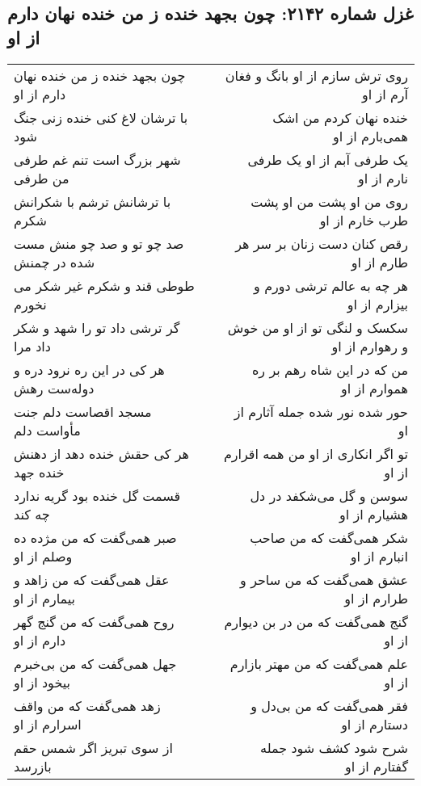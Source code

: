 \begin{center}
\section*{غزل شماره ۲۱۴۲: چون بجهد خنده ز من خنده نهان دارم از او}
\label{sec:2142}
\begin{longtable}{l p{0.5cm} r}
چون بجهد خنده ز من خنده نهان دارم از او
&&
روی ترش سازم از او بانگ و فغان آرم از او
\\
با ترشان لاغ کنی خنده زنی جنگ شود
&&
خنده نهان کردم من اشک همی‌بارم از او
\\
شهر بزرگ است تنم غم طرفی من طرفی
&&
یک طرفی آبم از او یک طرفی نارم از او
\\
با ترشانش ترشم با شکرانش شکرم
&&
روی من او پشت من او پشت طرب خارم از او
\\
صد چو تو و صد چو منش مست شده در چمنش
&&
رقص کنان دست زنان بر سر هر طارم از او
\\
طوطی قند و شکرم غیر شکر می نخورم
&&
هر چه به عالم ترشی دورم و بیزارم از او
\\
گر ترشی داد تو را شهد و شکر داد مرا
&&
سکسک و لنگی تو از او من خوش و رهوارم از او
\\
هر کی در این ره نرود دره و دوله‌ست رهش
&&
من که در این شاه رهم بر ره هموارم از او
\\
مسجد اقصاست دلم جنت مأواست دلم
&&
حور شده نور شده جمله آثارم از او
\\
هر کی حقش خنده دهد از دهنش خنده جهد
&&
تو اگر انکاری از او من همه اقرارم از او
\\
قسمت گل خنده بود گریه ندارد چه کند
&&
سوسن و گل می‌شکفد در دل هشیارم از او
\\
صبر همی‌گفت که من مژده ده وصلم از او
&&
شکر همی‌گفت که من صاحب انبارم از او
\\
عقل همی‌گفت که من زاهد و بیمارم از او
&&
عشق همی‌گفت که من ساحر و طرارم از او
\\
روح همی‌گفت که من گنج گهر دارم از او
&&
گنج همی‌گفت که من در بن دیوارم از او
\\
جهل همی‌گفت که من بی‌خبرم بیخود از او
&&
علم همی‌گفت که من مهتر بازارم از او
\\
زهد همی‌گفت که من واقف اسرارم از او
&&
فقر همی‌گفت که من بی‌دل و دستارم از او
\\
از سوی تبریز اگر شمس حقم بازرسد
&&
شرح شود کشف شود جمله گفتارم از او
\\
\end{longtable}
\end{center}
